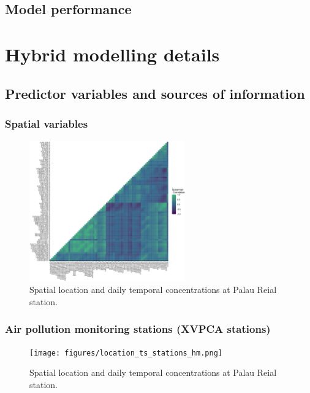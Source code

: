 \documentclass{article}
\begin{document}
\subsection{Model performance}


\newpage

\section{Hybrid modelling details}

\subsection{Predictor variables and sources of information}

\subsubsection{Spatial variables}

\captionsetup[figure]{skip=6pt} %
\begin{figure}[!htb]
    \centering
    \includegraphics[width=0.6\textwidth]{figures/lur_pred_corr.png} %
    \caption{Spatial location and daily temporal concentrations at Palau Reial station.}
    \label{FigureS1} %
\end{figure}


\subsubsection{Air pollution monitoring stations (XVPCA stations)}
\captionsetup[figure]{skip=6pt} %
\begin{figure}[!htb]
    \centering
    \texttt{[image: figures/location\_ts\_stations\_hm.png]} %
    \caption{Spatial location and daily temporal concentrations at Palau Reial station.}
    \label{FigureS1} %
\end{figure}
\end{document}
